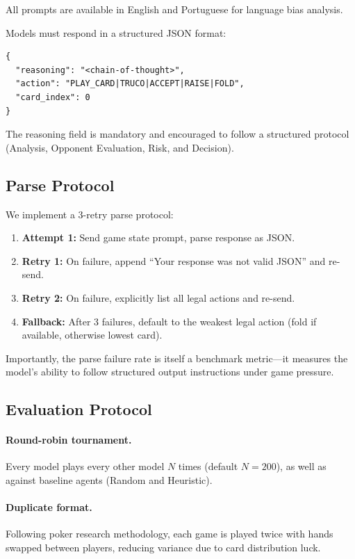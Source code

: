 All prompts are available in English and Portuguese for language bias analysis.

Models must respond in a structured JSON format:
\begin{verbatim}
{
  "reasoning": "<chain-of-thought>",
  "action": "PLAY_CARD|TRUCO|ACCEPT|RAISE|FOLD",
  "card_index": 0
}
\end{verbatim}

The reasoning field is mandatory and encouraged to follow a structured protocol (Analysis, Opponent Evaluation, Risk, and Decision).
\subsection{Parse Protocol}

We implement a 3-retry parse protocol:
\begin{enumerate}
    \item \textbf{Attempt 1:} Send game state prompt, parse response as JSON.
    \item \textbf{Retry 1:} On failure, append ``Your response was not valid JSON'' and re-send.
    \item \textbf{Retry 2:} On failure, explicitly list all legal actions and re-send.
    \item \textbf{Fallback:} After 3 failures, default to the weakest legal action (fold if available, otherwise lowest card).
\end{enumerate}

Importantly, the parse failure rate is itself a benchmark metric---it measures the model's ability to follow structured output instructions under game pressure.

\subsection{Evaluation Protocol}

\paragraph{Round-robin tournament.} Every model plays every other model $N$ times (default $N = 200$), as well as against baseline agents (Random and Heuristic).

\paragraph{Duplicate format.} Following poker research methodology, each game is played twice with hands swapped between players, reducing variance due to card distribution luck.

